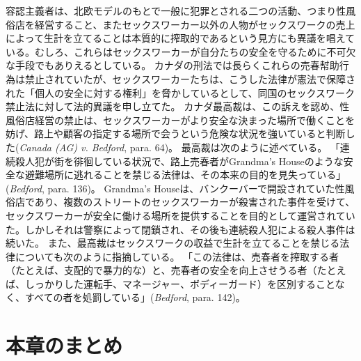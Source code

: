 \documentclass[paper=a4,book,openany]{jlreq}
\begin{document}
容認主義者は、北欧モデルのもとで一般に犯罪とされる二つの活動、つまり性風俗店を経営すること、またセックスワーカー以外の人物がセックスワークの売上によって生計を立てることは本質的に搾取的であるという見方にも異議を唱えている。むしろ、これらはセックスワーカーが自分たちの安全を守るために不可欠な手段でもありえるとしている。
カナダの刑法では長らくこれらの売春幇助行為は禁止されていたが、セックスワーカーたちは、こうした法律が憲法で保障された「個人の安全に対する権利」を脅かしているとして、同国のセックスワーク禁止法に対して法的異議を申し立てた。
カナダ最高裁は、この訴えを認め、性風俗店経営の禁止は、セックスワーカーがより安全な決まった場所で働くことを妨げ、路上や顧客の指定する場所で会うという危険な状況を強いていると判断した(\emph{Canada (AG) v. Bedford}, para. 64)。
最高裁は次のように述べている。
「連続殺人犯が街を徘徊している状況で、路上売春者がGrandma's Houseのような安全な避難場所に逃れることを禁じる法律は、その本来の目的を見失っている」(\emph{Bedford}, para. 136)。
Grandma's Houseは、バンクーバーで開設されていた性風俗店であり、複数のストリートのセックスワーカーが殺害された事件を受けて、セックスワーカーが安全に働ける場所を提供することを目的として運営されていた。しかしそれは警察によって閉鎖され、その後も連続殺人犯による殺人事件は続いた。
また、最高裁はセックスワークの収益で生計を立てることを禁じる法律についても次のように指摘している。
「この法律は、売春者を搾取する者（たとえば、支配的で暴力的な）と、売春者の安全を向上させうる者（たとえば、しっかりした運転手、マネージャー、ボディーガード）を区別することなく、すべての者を処罰している」(\emph{Bedford}, para. 142)。
\section{本章のまとめ}
\end{document}
